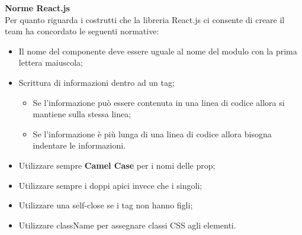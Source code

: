 \noindent \textbf{Norme React.js}\\
Per quanto riguarda i costrutti che la libreria React.js ci consente di creare il team ha concordato le seguenti normative:
\begin{itemize}
    \item Il nome del componente deve essere uguale al nome del modulo con la prima lettera maiuscola;
    \item Scrittura di informazioni dentro ad un tag;
    \begin{itemize}
        \item Se l’informazione può essere contenuta in una linea di codice allora si mantiene sulla stessa
        linea;
        \item Se l’informazione è più lunga di una linea di codice allora bisogna indentare le informazioni.
    \end{itemize}
    \item Utilizzare sempre \textbf{Camel Case} per i nomi delle prop;
    \item Utilizzare sempre i doppi apici invece che i singoli;
    \item Utilizzare una self-close se i tag non hanno figli;
    \item Utilizzare className per assegnare classi CSS agli elementi.
\end{itemize}
\vspace{1em}

